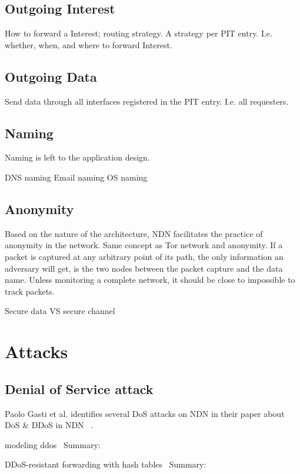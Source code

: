 \subsection{Outgoing Interest}
How to forward a Interest; routing strategy. A strategy per \gls{PIT} entry. I.e. whether, when, and where to forward Interest.

\subsection{Outgoing Data}
Send data through all interfaces registered in the \gls{PIT} entry. I.e. all requesters.

\subsection{Naming}
Naming is left to the application design.

\gls{DNS} naming
Email naming
\gls{OS} naming

\subsection{Anonymity}
Based on the nature of the architecture, \gls{NDN} facilitates the practice of anonymity in the network. 
Same concept as Tor network and anonymity.
If a packet is captured at any arbitrary point of its path, the only information an adversary will get, is the two nodes between the packet capture and the data name. Unless monitoring a complete network, it should be close to impossible to track packets.  

Secure data VS secure channel

\section{Attacks}

\subsection{Denial of Service attack}
Paolo Gasti et al. identifies several \gls{DoS} attacks on \gls{NDN} in their paper about \gls{DoS} \& \gls{DDoS} in \gls{NDN} ~\cite{DBLP:conf/icccn/GastiTU013}. 


modeling ddos~\cite{DBLP:journals/ijcomsys/WangCZQZ14}
Summary:


DDoS-resistant forwarding with hash tables~\cite{DBLP:conf/ancs/SoNO13}
Summary:


